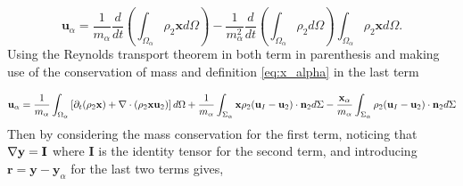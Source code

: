 \begin{equation}
    \textbf{u}_\alpha = \frac{1}{m_\alpha}
    \frac{d}{dt} 
    \left(
        \int_{\Omega_\alpha} \rho_2 \textbf{x} d\Omega
    \right)
    - \frac{1}{m_\alpha^2} \frac{d}{dt} \left(\int_{\Omega_\alpha} \rho_2 d\Omega \right)\int_{\Omega_\alpha} \rho_2 \textbf{x} d\Omega.
\end{equation}
Using the Reynolds transport theorem in both term in parenthesis and making use of the conservation of mass and definition \eqref{eq:x_alpha} in the last term

\begin{equation}
    \textbf{u}_\alpha = \frac{1}{m_\alpha}\int_{\Omega_\alpha} \left[
        \partial_t (\rho_2 \textbf{x}) + \mathbf{\nabla}\cdot\left(\rho_2 \textbf{x}\textbf{u}_2\right) 
    \right]d\Omega \\
    + \frac{1}{m_\alpha}\int_{\Sigma_\alpha} \textbf{x} \rho_2(\textbf{u}_I   - \textbf{u}_2) \cdot \textbf{n}_2 d \Sigma
    -  \frac{\textbf{x}_\alpha}{m_\alpha}    \int_{\Sigma_\alpha} \rho_2(\textbf{u}_I   - \textbf{u}_2) \cdot \textbf{n}_2 d\Sigma 
\end{equation}
Then by considering the mass conservation for the first term, noticing that $\mathbf{\nabla} \textbf{y} = \textbf{I}$ where $\textbf{I}$ is the identity tensor for the second term, and introducing $\mathbf{r} = \mathbf{y} - \mathbf{y}_\alpha$ for the last two terms gives, 

